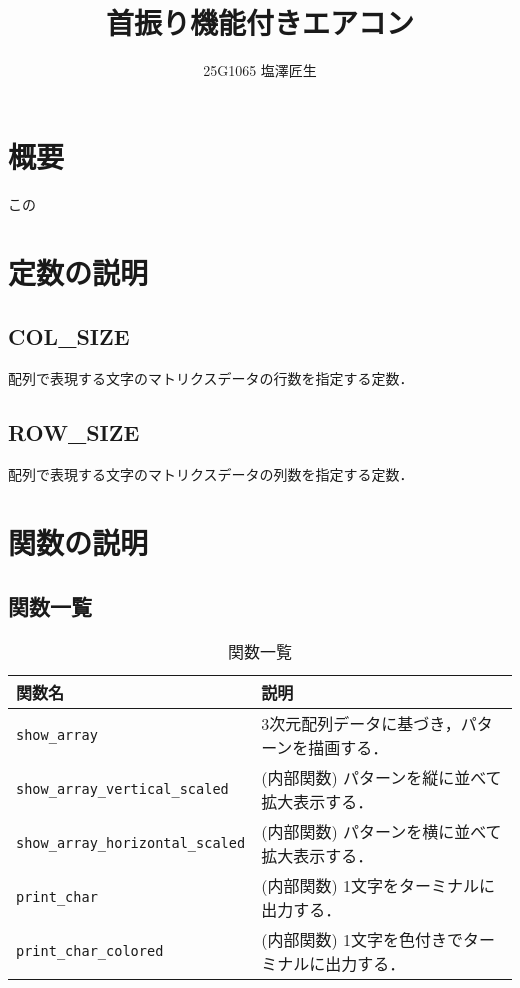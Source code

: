 \documentclass[uplatex]{jsarticle}
\begin{document}
\title{首振り機能付きエアコン}
\author{25G1065 塩澤匠生}

\maketitle


\section{概要}

この

\section{定数の説明}
\subsection{COL\_SIZE}
配列で表現する文字のマトリクスデータの行数を指定する定数．
\subsection{ROW\_SIZE}
配列で表現する文字のマトリクスデータの列数を指定する定数．

\section{関数の説明}
\subsection{関数一覧}
\begin{table}[H]
    \centering
    \caption{関数一覧}
    \begin{tabular}{|l|p{9cm}|}
        \hline
        \textbf{関数名} & \textbf{説明} \\ \hline
        \texttt{show\_array} & 3次元配列データに基づき，パターンを描画する． \\ \hline
        \texttt{show\_array\_vertical\_scaled} & (内部関数) パターンを縦に並べて拡大表示する． \\ \hline
        \texttt{show\_array\_horizontal\_scaled} & (内部関数) パターンを横に並べて拡大表示する． \\ \hline
        \texttt{print\_char} & (内部関数) 1文字をターミナルに出力する． \\ \hline
        \texttt{print\_char\_colored} & (内部関数) 1文字を色付きでターミナルに出力する． \\ \hline
    \end{tabular}
\end{table}
\end{document}
